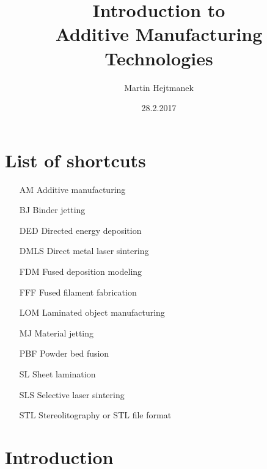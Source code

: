 \documentclass[a4paper]{report}
\begin{document}
%
\begin{titlepage}
\title{Introduction to\\Additive Manufacturing Technologies}
\author{Martin Hejtmanek}
\date{28.2.2017}
\maketitle
\end{titlepage}
%
\chapter*{List of shortcuts}
\begin{itemize}
\item[AM]Additive manufacturing
\item[BJ]Binder jetting
\item[DED]Directed energy deposition
\item[DMLS]Direct metal laser sintering
\item[FDM]Fused deposition modeling
\item[FFF]Fused filament fabrication
\item[LOM]Laminated object manufacturing
\item[MJ]Material jetting
\item[PBF]Powder bed fusion
\item[SL]Sheet lamination
\item[SLS]Selective laser sintering
\item[STL]Stereolitography or STL file format
\end{itemize}


\chapter{Introduction}
%
%
%
\end{document}
